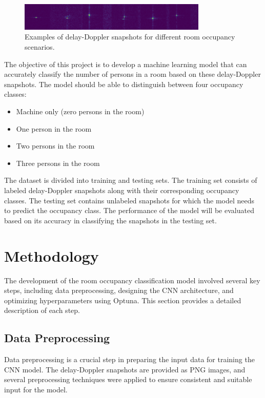 \documentclass{article}
\begin{document}
\begin{figure}[H]
    \centering
    \includegraphics[width=0.8\textwidth]{training_data_example.png}
    \caption{Examples of delay-Doppler snapshots for different room occupancy scenarios.}
    \label{fig:snapshots}
\end{figure}

The objective of this project is to develop a machine learning model that can accurately classify the number of persons in a room based on these delay-Doppler snapshots. The model should be able to distinguish between four occupancy classes:

\begin{itemize}
    \item Machine only (zero persons in the room)
    \item One person in the room
    \item Two persons in the room
    \item Three persons in the room
\end{itemize}

The dataset is divided into training and testing sets. The training set consists of labeled delay-Doppler snapshots along with their corresponding occupancy classes. The testing set contains unlabeled snapshots for which the model needs to predict the occupancy class. The performance of the model will be evaluated based on its accuracy in classifying the snapshots in the testing set.

\section{Methodology}
The development of the room occupancy classification model involved several key steps, including data preprocessing, designing the CNN architecture, and optimizing hyperparameters using Optuna. This section provides a detailed description of each step.

\subsection{Data Preprocessing}
Data preprocessing is a crucial step in preparing the input data for training the CNN model. The delay-Doppler snapshots are provided as PNG images, and several preprocessing techniques were applied to ensure consistent and suitable input for the model.
\end{document}
